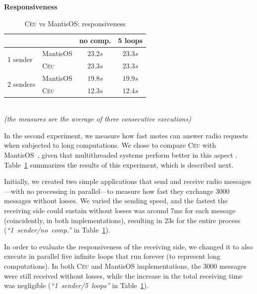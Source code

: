 \documentclass{sigplan-proc}
\newcommand{\2}{\;\;}
\newcommand{\5}{\;\;\;\;\;}
\newcommand{\CEU}{\textsc{C\'{e}u}}
\newcommand{\nesc}{\emph{nesC}}
\begin{document}

\textbf{Responsiveness}

\begin{table}[t]\small
\begin{center}
\begin{tabular}{ | l | l | c | c | }
\hline
\multicolumn{2}{|c|}{}
               & no comp. &    5 loops \\
\hline\hline
\multirow{2}{*}{1 sender}
    & MantisOS &  $23.2s$ &    $23.3s$ \\
    & \CEU     &  $23.3s$ &    $23.3s$ \\
\hline\hline
\multirow{2}{*}{2 senders}
    & MantisOS &  $19.8s$ &   $19.9s$ \\
    & \CEU     &  $12.3s$ &   $12.4s$ \\
\hline
\end{tabular}
\\
{\scriptsize\emph{(the measures are the average of three consecutive 
executions)}}
\caption{\CEU{} vs MantisOS: responsiveness}
\label{tab:resp}
\end{center}
\end{table}

In the second experiment, we measure how fast motes can answer radio requests 
when subjected to long computations.
We chose to compare \CEU{} with MantisOS~\cite{wsn.mantisos}, given that 
multithreaded systems perform better in this aspect \cite{wsn.comparison}.
Table~\ref{tab:resp} summarizes the results of this experiment, which is 
described next.

Initially, we created two simple applications that send and receive radio 
messages---with no processing in parallel---to measure how fast they exchange 
$3000$ messages without losses.
We varied the sending speed, and the fastest the receiving side could sustain 
without losses was around $7$ms for each message (coincidently, in both 
implementations), resulting in $23$s for the entire process 
(\emph{``1~sender/no~comp.''} in Table~\ref{tab:resp}).

In order to evaluate the responsiveness of the receiving side, we changed it to 
also execute in parallel five infinite loops that run forever (to represent 
long computations).
In both \CEU{} and MantisOS implementations, the $3000$ messages were still 
received without losses, while the increase in the total receiving time was 
negligible
(\emph{``1~sender/5~loops''} in Table~\ref{tab:resp}).
\end{document}
